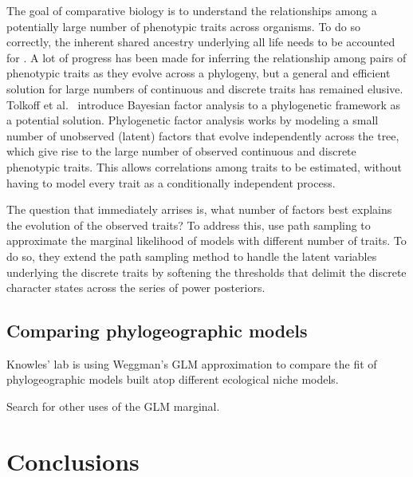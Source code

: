The goal of comparative biology is to understand the relationships among a
potentially large number of phenotypic traits across organisms. 
To do so correctly, the inherent shared ancestry underlying all life needs to
be accounted for \citep{Felsenstein1985PIC}.
A lot of progress has been made for inferring the relationship among pairs
of phenotypic traits as they evolve across a phylogeny,
but a general and efficient solution for large numbers of continuous
and discrete traits has remained elusive.
Tolkoff et al.\ \citeyear{Tolkoff2017} introduce Bayesian factor analysis to a
phylogenetic framework as a potential solution.
Phylogenetic factor analysis works by modeling a small number of unobserved
(latent) factors that evolve independently across the tree, which give rise to
the large number of observed continuous and discrete phenotypic traits.
This allows correlations among traits to be estimated, without having to model
every trait as a conditionally independent process.

The question that immediately arrises is, what number of factors best explains
the evolution of the observed traits?
To address this, \citep{Tolkoff2017} use path sampling to approximate the
marginal likelihood of models with different number of traits.
To do so, they extend the path sampling method to handle the latent variables
underlying the discrete traits by softening the thresholds that delimit the
discrete character states across the series of power posteriors.


\subsection{Comparing phylogeographic models}

Knowles' lab is using Weggman's GLM approximation to compare the fit of
phylogeographic models built atop different ecological niche models.

Search for other uses of the GLM marginal.

\section{Conclusions}

